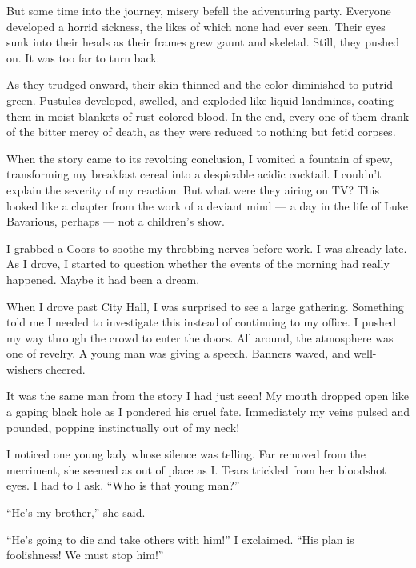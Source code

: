 But some time into the journey, misery befell the adventuring
party. Everyone developed a horrid sickness, the likes of which
none had ever seen. Their eyes sunk into their heads as their
frames grew gaunt and skeletal. Still, they pushed on. It was too
far to turn back.



As they trudged onward, their skin thinned and the color diminished
to putrid green. Pustules developed, swelled, and exploded like
liquid landmines, coating them in moist blankets of rust colored
blood. In the end, every one of them drank of the bitter mercy of
death, as they were reduced to nothing but fetid corpses.



When the story came to its revolting conclusion, I vomited a
fountain of spew, transforming my breakfast cereal into a
despicable acidic cocktail. I couldn't explain the severity
of my reaction. But what were they airing on TV? This looked like a
chapter from the work of a deviant mind --- a day in the life
of Luke Bavarious, perhaps --- not a children's
show.



I grabbed a Coors to soothe my throbbing nerves before work. I was
already late. As I drove, I started to question whether the events
of the morning had really happened. Maybe it had been a
dream.



When I drove past City Hall, I was surprised to see a large
gathering. Something told me I needed to investigate this instead
of continuing to my office. I pushed my way through the crowd to
enter the doors. All around, the atmosphere was one of revelry. A
young man was giving a speech. Banners waved, and well-wishers
cheered.



It was the same man from the story I had just seen! My mouth
dropped open like a gaping black hole as I pondered his cruel fate.
Immediately my veins pulsed and pounded, popping instinctually out
of my neck!



I noticed one young lady whose silence was telling. Far removed
from the merriment, she seemed as out of place as I. Tears trickled
from her bloodshot eyes. I had to I ask. ``Who is that young
man?''



``He's my brother,'' she said.



``He's going to die and take others with him!'' I
exclaimed. ``His plan is foolishness! We must stop
him!''




